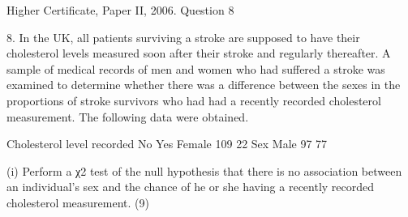 \documentclass[a4paper,12pt]{article}
\begin{document}
Higher Certificate, Paper II, 2006.  Question 8 
\begin{framed}
8. In the UK, all patients surviving a stroke are supposed to have their cholesterol levels measured soon after their stroke and regularly thereafter.  A sample of medical records of men and women who had suffered a stroke was examined to determine whether there was a difference between the sexes in the proportions of stroke survivors who had had a recently recorded cholesterol measurement.  The following data were obtained. 
 
  Cholesterol level recorded   No Yes 
  Female 109 22 
  Sex Male 97 77 
 
 
(i) Perform a χ2 test of the null hypothesis that there is no association between an individual's sex and the chance of he or she having a recently recorded cholesterol measurement. (9) 
 
 
\end{framed}
\end{document}
